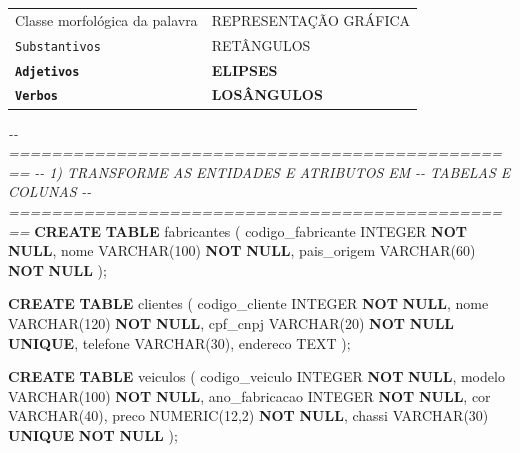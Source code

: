 \documentclass[
]{book}
\newenvironment{Shaded}{\begin{snugshade}}{\end{snugshade}}
\newcommand{\CommentTok}[1]{\textcolor[rgb]{0.56,0.35,0.01}{\textit{#1}}}
\newcommand{\DataTypeTok}[1]{\textcolor[rgb]{0.13,0.29,0.53}{#1}}
\newcommand{\DecValTok}[1]{\textcolor[rgb]{0.00,0.00,0.81}{#1}}
\newcommand{\KeywordTok}[1]{\textcolor[rgb]{0.13,0.29,0.53}{\textbf{#1}}}
\newcommand{\NormalTok}[1]{#1}
\begin{document}
\begin{longtable}[]{@{}ll@{}}
\toprule\noalign{}
\endhead
\bottomrule\noalign{}
\endlastfoot
Classe morfológica da palavra & REPRESENTAÇÃO GRÁFICA \\
\texttt{Substantivos} & RETÂNGULOS \\
\textbf{\texttt{Adjetivos}} & \textbf{ELIPSES} \\
\textbf{\texttt{Verbos}} & \textbf{LOSÂNGULOS} \\
\end{longtable}



\begin{Shaded}
\begin{Highlighting}[]


\CommentTok{{-}{-} ================================================}
\CommentTok{{-}{-} 1) TRANSFORME AS ENTIDADES E ATRIBUTOS EM }
\CommentTok{{-}{-}    TABELAS E COLUNAS}
\CommentTok{{-}{-} ================================================}
\KeywordTok{CREATE} \KeywordTok{TABLE}\NormalTok{ fabricantes}
\NormalTok{(}
\NormalTok{    codigo\_fabricante  }\DataTypeTok{INTEGER}      \KeywordTok{NOT} \KeywordTok{NULL}\NormalTok{,}
\NormalTok{    nome               }\DataTypeTok{VARCHAR}\NormalTok{(}\DecValTok{100}\NormalTok{) }\KeywordTok{NOT} \KeywordTok{NULL}\NormalTok{,}
\NormalTok{    pais\_origem        }\DataTypeTok{VARCHAR}\NormalTok{(}\DecValTok{60}\NormalTok{)  }\KeywordTok{NOT} \KeywordTok{NULL}
\NormalTok{);}

\KeywordTok{CREATE} \KeywordTok{TABLE}\NormalTok{ clientes}
\NormalTok{(}
\NormalTok{    codigo\_cliente   }\DataTypeTok{INTEGER}      \KeywordTok{NOT} \KeywordTok{NULL}\NormalTok{,}
\NormalTok{    nome             }\DataTypeTok{VARCHAR}\NormalTok{(}\DecValTok{120}\NormalTok{) }\KeywordTok{NOT} \KeywordTok{NULL}\NormalTok{,}
\NormalTok{    cpf\_cnpj         }\DataTypeTok{VARCHAR}\NormalTok{(}\DecValTok{20}\NormalTok{)  }\KeywordTok{NOT} \KeywordTok{NULL} \KeywordTok{UNIQUE}\NormalTok{,}
\NormalTok{    telefone         }\DataTypeTok{VARCHAR}\NormalTok{(}\DecValTok{30}\NormalTok{),}
\NormalTok{    endereco         TEXT}
\NormalTok{);}

\KeywordTok{CREATE} \KeywordTok{TABLE}\NormalTok{ veiculos }
\NormalTok{(}
\NormalTok{    codigo\_veiculo      }\DataTypeTok{INTEGER}       \KeywordTok{NOT} \KeywordTok{NULL}\NormalTok{,}
\NormalTok{    modelo              }\DataTypeTok{VARCHAR}\NormalTok{(}\DecValTok{100}\NormalTok{)  }\KeywordTok{NOT} \KeywordTok{NULL}\NormalTok{,}
\NormalTok{    ano\_fabricacao      }\DataTypeTok{INTEGER}       \KeywordTok{NOT} \KeywordTok{NULL}\NormalTok{,}
\NormalTok{    cor                 }\DataTypeTok{VARCHAR}\NormalTok{(}\DecValTok{40}\NormalTok{),}
\NormalTok{    preco               }\DataTypeTok{NUMERIC}\NormalTok{(}\DecValTok{12}\NormalTok{,}\DecValTok{2}\NormalTok{) }\KeywordTok{NOT} \KeywordTok{NULL}\NormalTok{,}
\NormalTok{    chassi              }\DataTypeTok{VARCHAR}\NormalTok{(}\DecValTok{30}\NormalTok{)   }\KeywordTok{UNIQUE} \KeywordTok{NOT} \KeywordTok{NULL}
\NormalTok{);}


\end{Highlighting}
\end{Shaded}
\end{document}
